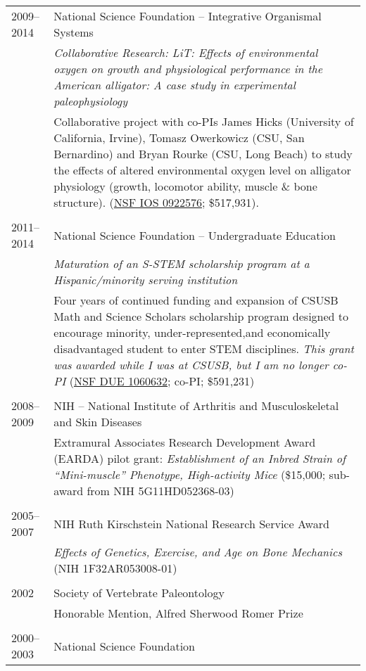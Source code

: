 \begin{longtable}{@{}lX@{}}
    2009--2014 & National Science Foundation -- Integrative Organismal Systems\\
    & \textit{Collaborative Research: LiT: Effects of environmental oxygen on growth and physiological performance in the American alligator: A case study in experimental paleophysiology}\\[0.5pc]
    & Collaborative project with co-PIs James Hicks (University of California, Irvine), Tomasz Owerkowicz (CSU, San Bernardino) and Bryan Rourke (CSU, Long Beach) to study the effects of altered environmental oxygen level on alligator physiology (growth, locomotor ability, muscle \& bone structure). (\href{http://www.nsf.gov/awardsearch/showAward.do?AwardNumber=0922576}{NSF IOS 0922576}; \$517,931).\\
    \\
    2011--2014 & National Science Foundation -- Undergraduate Education\\
    & \textit{Maturation of an S-STEM scholarship program at a Hispanic/minority serving institution}\\[0.5pc]
    & Four years of continued funding and expansion of CSUSB Math and Science Scholars scholarship program designed to encourage minority, under-represented,and economically disadvantaged student to enter STEM disciplines. \emph{This grant was awarded while I was at CSUSB, but I am no longer co-PI} (\href{http://www.nsf.gov/awardsearch/showAward.do?AwardNumber=1060632}{NSF DUE 1060632}; co-PI; \$591,231)\\
    \\
    2008--2009 & NIH -- National Institute of Arthritis and Musculoskeletal and Skin Diseases\\
    & Extramural Associates Research Development Award (EARDA) pilot grant: \textit{Establishment of an Inbred Strain of ``Mini-muscle'' Phenotype, High-activity Mice} (\$15,000; sub-award from NIH 5G11HD052368-03)\\
    \\
    2005--2007 & NIH Ruth Kirschstein National Research Service Award\\
    & \textit{Effects of Genetics, Exercise, and Age on Bone Mechanics} (NIH 1F32AR053008-01)\\
    \\
    2002 & Society of Vertebrate Paleontology\\
    & Honorable Mention, Alfred Sherwood Romer Prize\\
    \\
    2000--2003 & National Science Foundation\\

\end{longtable}

